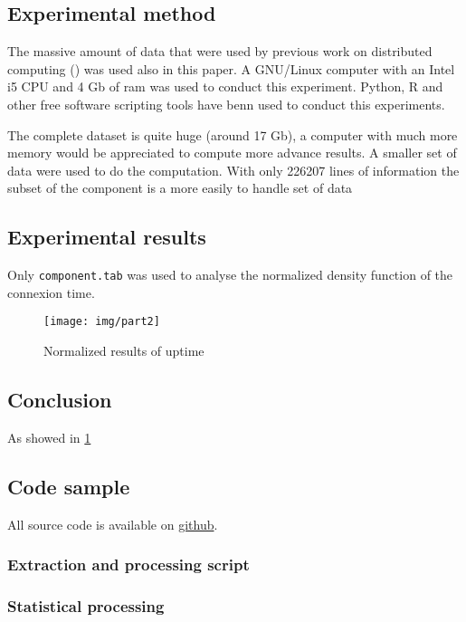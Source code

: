 \documentclass{sig-alternate-10pt}
\begin{document}
\subsection{Experimental method}

The massive amount of data that were used by previous work on distributed computing (\cite{ja_ko_mascots09})
was used also in this paper. A GNU/Linux computer with an Intel i5 CPU and 4 Gb of ram was used to conduct this
experiment. Python, R and other free software scripting tools have benn used to conduct this experiments.

The complete dataset is quite huge (around 17 Gb), a computer with much more memory would be appreciated to
compute more advance results. A smaller set of data were used to do the computation. With only 226207 lines 
of information the subset of the component is a more easily to handle set of data

\subsection{Experimental results}

Only \texttt{component.tab} was used to analyse the normalized density function of the connexion time.


\begin{figure}[h]
\begin{center}
\texttt{[image: img/part2]}
\end{center}
\caption{Normalized results of uptime}
\label{part2}
\end{figure}


\subsection{Conclusion}

As showed in \ref{part2}


\subsection{Code sample}

All source code is available on 
\href{https://github.com/sieben/upmc/tree/master/methodologie/homework2-gnuplot}{github}.

\subsubsection{Extraction and processing script}



\subsubsection{Statistical processing}





\end{document}
